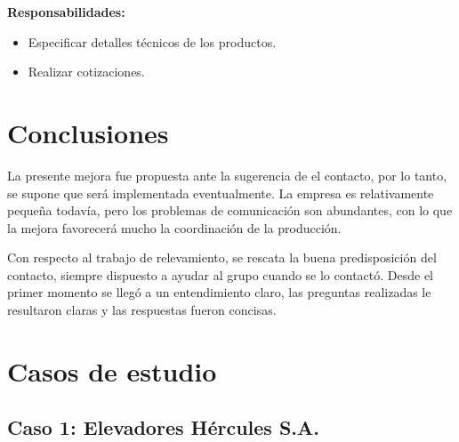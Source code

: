 \documentclass[a4paper,10pt]{article}
\begin{document}
		\textbf{Responsabilidades:}
		\begin{itemize}
			\item Especificar detalles técnicos de los productos.
			\item Realizar cotizaciones.
		\end{itemize}
\newpage
\section{Conclusiones}
La presente mejora fue propuesta ante la sugerencia de el contacto, por lo tanto, se supone que será
implementada eventualmente. La empresa es relativamente pequeña todavía, pero los problemas de comunicación
son abundantes, con lo que la mejora favorecerá mucho la coordinación de la producción.

Con respecto al trabajo de relevamiento, se rescata la buena predisposición del contacto, siempre
dispuesto a ayudar al grupo cuando se lo contactó. Desde el primer momento se llegó a un entendimiento
claro, las preguntas realizadas le resultaron claras y las respuestas fueron concisas.
\newpage
\section{Casos de estudio}
	\subsection{Caso 1: Elevadores Hércules S.A.}
\end{document}
